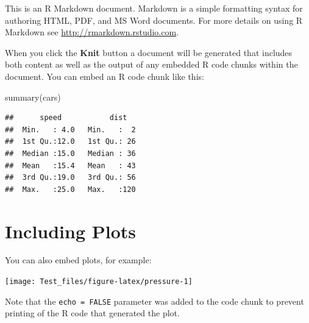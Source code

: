 \documentclass[
]{book}
\newenvironment{Shaded}{\begin{snugshade}}{\end{snugshade}}
\newcommand{\FunctionTok}[1]{\textcolor[rgb]{0.00,0.00,0.00}{#1}}
\newcommand{\NormalTok}[1]{#1}
\begin{document}
This is an R Markdown document. Markdown is a simple formatting syntax for authoring HTML, PDF, and MS Word documents. For more details on using R Markdown see \url{http://rmarkdown.rstudio.com}.

When you click the \textbf{Knit} button a document will be generated that includes both content as well as the output of any embedded R code chunks within the document. You can embed an R code chunk like this:

\begin{Shaded}
\begin{Highlighting}[]
\FunctionTok{summary}\NormalTok{(cars)}
\end{Highlighting}
\end{Shaded}

\begin{verbatim}
##      speed           dist    
##  Min.   : 4.0   Min.   :  2  
##  1st Qu.:12.0   1st Qu.: 26  
##  Median :15.0   Median : 36  
##  Mean   :15.4   Mean   : 43  
##  3rd Qu.:19.0   3rd Qu.: 56  
##  Max.   :25.0   Max.   :120
\end{verbatim}

\hypertarget{including-plots}{%
\section{Including Plots}\label{including-plots}}

You can also embed plots, for example:

\begin{center}\texttt{[image: Test\_files/figure-latex/pressure-1]} \end{center}

Note that the \texttt{echo\ =\ FALSE} parameter was added to the code chunk to prevent printing of the R code that generated the plot.

  
\end{document}
